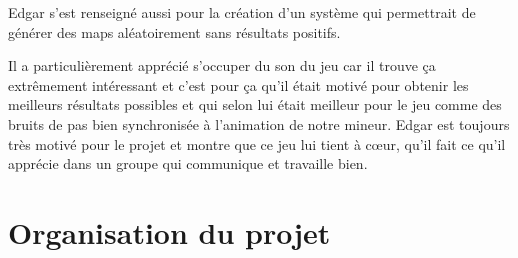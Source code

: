 \documentclass[titlepage, 13px, a4paper]{article}
\begin{document}
Edgar s’est renseigné aussi pour la création d’un système qui permettrait de générer des maps aléatoirement sans résultats positifs. 

Il a particulièrement apprécié s'occuper du son du jeu car il trouve ça extrêmement intéressant et c’est pour ça qu’il était motivé 
pour obtenir les meilleurs résultats possibles et qui selon lui était meilleur pour le jeu comme des bruits de pas bien synchronisée 
à l’animation de notre mineur. Edgar est toujours très motivé pour le projet et montre que ce jeu lui tient à cœur, qu'il fait 
ce qu’il apprécie dans un groupe qui communique et travaille bien.







\newpage
\part{Organisation du projet}
\end{document}

